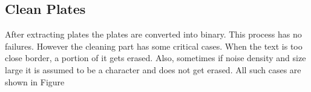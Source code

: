 \subsection{Clean Plates}
After extracting plates the plates are converted into binary. This process has no failures. However the cleaning part has some critical cases. When the text is too close border, a portion of it gets erased. Also, sometimes if noise density and size large it is assumed to be a character and does not get erased. All such cases are shown in Figure 


